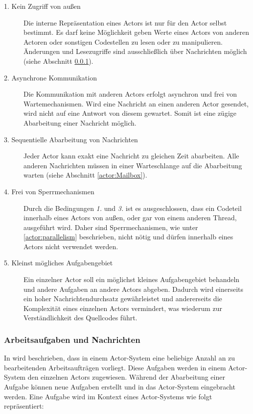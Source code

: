\begin{description}
    \item[1. Kein Zugriff von außen]\label{actor:requirements:shareNothing}
    Die interne Repräsentation eines Actors ist nur für den Actor selbst bestimmt. Es darf keine Möglichkeit geben Werte eines Actors von anderen Actoren oder sonstigen Codestellen zu lesen oder zu manipulieren. Änderungen und Lesezugriffe sind ausschließlich über Nachrichten möglich (siehe Abschnitt \ref{sec:actors:messages}). 
    \item[2. Asynchrone Kommunikation]\label{actor:requirements:AsynchronCommunication}
    Die Kommunikation mit anderen Actors erfolgt asynchron und frei von Wartemechanismen. Wird eine Nachricht an einen anderen Actor gesendet, wird nicht auf eine Antwort von diesem gewartet. Somit ist eine zügige Abarbeitung einer Nachricht möglich.
    \item[3. Sequentielle Abarbeitung von Nachrichten]
    Jeder Actor kann exakt eine Nachricht zu gleichen Zeit abarbeiten. Alle anderen Nachrichten müssen in einer Warteschlange auf die Abarbeitung warten (siehe Abschnitt \ref{actor:Mailbox}).
    \item[4. Frei von Sperrmechanismen]
    Durch die Bedingungen \textit{1.} und  \textit{3.} ist es ausgeschlossen, dass ein Codeteil innerhalb eines Actors von außen, oder gar von einem anderen Thread, ausgeführt wird. Daher sind Sperrmechanismen, wie unter \ref{actor:parallelism} beschrieben, nicht nötig und dürfen innerhalb eines Actors nicht verwendet werden.
    \item[5. Kleinst mögliches Aufgabengebiet]
    Ein einzelner Actor soll ein möglichst kleines Aufgabengebiet behandeln und andere Aufgaben an andere Actors abgeben. Dadurch wird einerseits ein hoher Nachrichtendurchsatz gewährleistet und andererseits die Komplexität eines einzelnen Actors vermindert, was wiederum zur Verständlichkeit des Quellcodes führt.
\end{description}

\subsubsection{Arbeitsaufgaben und Nachrichten}\label{sec:actors:messages}
In \cite{Agha1985ActorsSystems} wird beschrieben, dass in einem Actor-System eine beliebige Anzahl an zu bearbeitenden Arbeitsaufträgen vorliegt. Diese Aufgaben werden in einem Actor-System den einzelnen Actors zugewiesen. Während der Abarbeitung einer Aufgabe können neue Aufgaben erstellt und in das Actor-System eingebracht werden. Eine Aufgabe wird im Kontext eines Actor-Systems wie folgt repräsentiert:

